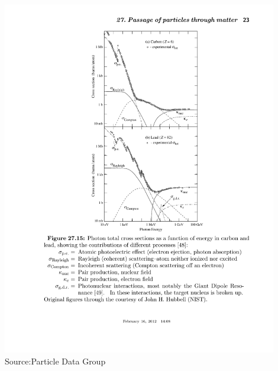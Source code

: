\begin{center}
\includegraphics[width=0.90\textwidth]{fig/detector/photon_interactions_pdg.pdf}\\\tiny{Source:Particle Data Group}
\end{center}

